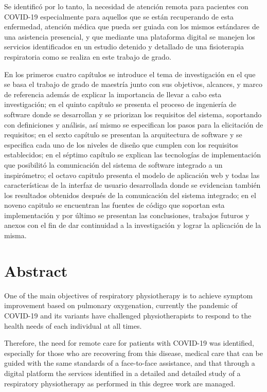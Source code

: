 \documentclass[12pt]{article}
\begin{document}
Se identificó por lo tanto, la necesidad de atención remota para pacientes con COVID-19 especialmente para aquellos que se están recuperando de esta enfermedad, atención médica que pueda ser guiada con los mismos estándares de una asistencia presencial, y que  mediante una plataforma digital se manejen los servicios identificados en un estudio detenido y detallado de una fisioterapia respiratoria como se realiza en este trabajo de grado.

En los primeros cuatro capítulos se introduce el tema de investigación en el que se basa el trabajo de grado de maestría junto con sus objetivos, alcances, y marco de referencia además de explicar la importancia de llevar a cabo esta investigación; en el quinto capítulo se presenta el proceso de ingeniería de software donde se desarrollan y se priorizan los requisitos del sistema, soportando con definiciones y análisis, así mismo se especifican los pasos para la elicitación de requisitos; en el sexto capítulo se presentan la arquitectura de software y se especifica cada uno de los niveles de diseño que cumplen con los requisitos establecidos; en el séptimo capítulo se explican las tecnologías de implementación que posibilitó la comunicación del sistema de software integrado a un inspirómetro; el octavo capitulo presenta el modelo de aplicación web y todas las características de la interfaz de usuario desarrollada donde se evidencian también los resultados obtenidos después de la comunicación del sistema integrado; en el noveno capitulo se encuentran las fuentes de código que soportan esta implementación y por último se presentan las conclusiones, trabajos futuros y anexos con el fin de dar continuidad a la investigación y lograr la aplicación de la misma. 


\newpage

\section*{Abstract}

One of the main objectives of respiratory physiotherapy is to achieve symptom improvement based on pulmonary oxygenation, currently the pandemic of COVID-19 and its variants have challenged physiotherapists to respond to the health needs of each individual at all times.

Therefore, the need for remote care for patients with COVID-19 was identified, especially for those who are recovering from this disease, medical care that can be guided with the same standards of a face-to-face assistance, and that through a digital platform the services identified in a detailed and detailed study of a respiratory physiotherapy as performed in this degree work are managed.
\end{document}
